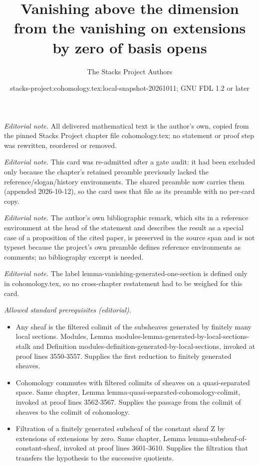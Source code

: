 \documentclass[10pt,a4paper]{amsart}
\title{Vanishing above the dimension from the vanishing on extensions by zero of basis opens}
\author{The Stacks Project Authors}
\date{stacks-project:cohomology.tex:local-snapshot-20261011; GNU FDL 1.2 or later}
\theoremstyle{plain}
\theoremstyle{definition}
\theoremstyle{remark}
\numberwithin{equation}{subsection}
\begin{document}
\maketitle
\noindent\textit{Editorial note.} All delivered mathematical text is the author's own, copied from the pinned Stacks Project chapter file cohomology.tex; no statement or proof step was rewritten, reordered or removed.\par\medskip
\noindent\textit{Editorial note.} This card was re-admitted after a gate audit: it had been excluded only because the chapter's retained preamble previously lacked the reference/slogan/history environments. The shared preamble now carries them (appended 2026-10-12), so the card uses that file as its preamble with no per-card copy.\par\medskip
\noindent\textit{Editorial note.} The author's own bibliographic remark, which sits in a reference environment at the head of the statement and describes the result as a special case of a proposition of the cited paper, is preserved in the source span and is not typeset because the project's own preamble defines reference environments as comments; no bibliography excerpt is needed.\par\medskip
\noindent\textit{Editorial note.} The label lemma-vanishing-generated-one-section is defined only in cohomology.tex, so no cross-chapter restatement had to be weighed for this card.\par\medskip
\noindent\textit{Allowed standard prerequisites (editorial).}\begin{itemize}
\item Any sheaf is the filtered colimit of the subsheaves generated by finitely many local sections. Modules, Lemma modules-lemma-generated-by-local-sections-stalk and Definition modules-definition-generated-by-local-sections, invoked at proof lines 3550-3557. Supplies the first reduction to finitely generated sheaves.
\item Cohomology commutes with filtered colimits of sheaves on a quasi-separated space. Same chapter, Lemma lemma-quasi-separated-cohomology-colimit, invoked at proof lines 3562-3567. Supplies the passage from the colimit of sheaves to the colimit of cohomology.
\item Filtration of a finitely generated subsheaf of the constant sheaf Z by extensions of extensions by zero. Same chapter, Lemma lemma-subsheaf-of-constant-sheaf, invoked at proof lines 3601-3610. Supplies the filtration that transfers the hypothesis to the successive quotients.
\end{itemize}\medskip
\end{document}
